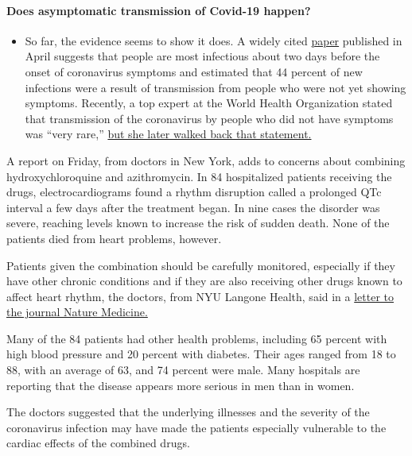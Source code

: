 \begin{itemize}
{  \paragraph{Does asymptomatic transmission of Covid-19
  happen?}\label{does-asymptomatic-transmission-of-covid-19-happen}}

  \begin{itemize}
  \tightlist
  \item
    So far, the evidence seems to show it does. A widely cited
    \href{https://www.nature.com/articles/s41591-020-0869-5}{paper}
    published in April suggests that people are most infectious about
    two days before the onset of coronavirus symptoms and estimated that
    44 percent of new infections were a result of transmission from
    people who were not yet showing symptoms. Recently, a top expert at
    the World Health Organization stated that transmission of the
    coronavirus by people who did not have symptoms was ``very rare,''
    \href{https://www.nytimes3xbfgragh.onion/2020/06/09/world/coronavirus-updates.html?action=click\&pgtype=Article\&state=default\&region=MAIN_CONTENT_3\&context=storylines_faq\#link-1f302e21}{but
    she later walked back that statement.}
  \end{itemize}
\end{itemize}

A report on Friday, from doctors in New York, adds to concerns about
combining hydroxychloroquine and azithromycin. In 84 hospitalized
patients receiving the drugs, electrocardiograms found a rhythm
disruption called a prolonged QTc interval a few days after the
treatment began. In nine cases the disorder was severe, reaching levels
known to increase the risk of sudden death. None of the patients died
from heart problems, however.

Patients given the combination should be carefully monitored, especially
if they have other chronic conditions and if they are also receiving
other drugs known to affect heart rhythm, the doctors, from NYU Langone
Health, said in a
\href{https://www.nature.com/articles/s41591-020-0888-2}{letter to the
journal Nature Medicine.}

Many of the 84 patients had other health problems, including 65 percent
with high blood pressure and 20 percent with diabetes. Their ages ranged
from 18 to 88, with an average of 63, and 74 percent were male. Many
hospitals are reporting that the disease appears more serious in men
than in women.

The doctors suggested that the underlying illnesses and the severity of
the coronavirus infection may have made the patients especially
vulnerable to the cardiac effects of the combined drugs.

